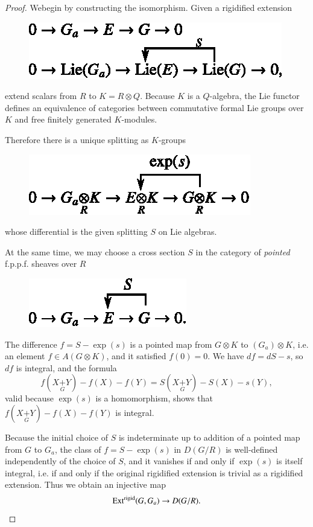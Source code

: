 \begin{proof}
We\pageoriginale begin by constructing the isomorphism. Given a rigidified extension
\begin{figure}[H]
\centering
\includegraphics[scale=1.05]{chap6/fig7.eps}
\end{figure}
extend scalars from $R$ to $K=R\otimes Q$. Because $K$ is a $Q$-algebra, the Lie functor defines an equivalence of categories between commutative formal Lie groups over $K$ and free finitely generated $K$-modules.

Therefore there is a unique splitting as $K$-groups
\begin{figure}[H]
\centering
\includegraphics[scale=1.05]{chap6/fig8.eps}
\end{figure}
whose differential is the given splitting $S$ on Lie algebras.

At the same time, we may choose a cross section $S$ in the category of {\em pointed} f.p.p.f. sheaves over $R$
\begin{figure}[H]
\centering
\includegraphics[scale=1.05]{chap6/fig9.eps}
\end{figure}

The difference $f=S-\exp(s)$ is a pointed map from $G\otimes K$ to $(G_{a})\otimes K$, i.e. an element $f\in A(G\otimes K)$, and it satisfied $f(0)=0$. We have $df=dS-s$, so $df$ is integral, and the formula
$$
f(X{\displaystyle{\mathop{+}\limits_{G}}}Y)-f(X)-f(Y)=S(X{\displaystyle{\mathop{+}\limits_{G}}}Y)-S(X)-s(Y),
$$
valid because $\exp(s)$ is a homomorphism, shows that $f(X{\displaystyle{\mathop{+}\limits_{G}}}Y)-f(X)-f(Y)$ is integral.

Because the initial choice of $S$ is indeterminate up to addition of a pointed map from $G$ to $G_{a}$, the class of $f=S-\exp (s)$ in $D(G/R)$ is well-defined independently of the choice of $S$, and it vanishes if and only if $\exp(s)$ is itself integral, i.e. if and only if the original rigidified extension is trivial as a rigidified extension. Thus we obtain an injective map
$$
\operatorname{Ext}^{\text{rigid}}(G,G_{a})\to D(G/R).
$$


\end{proof}
